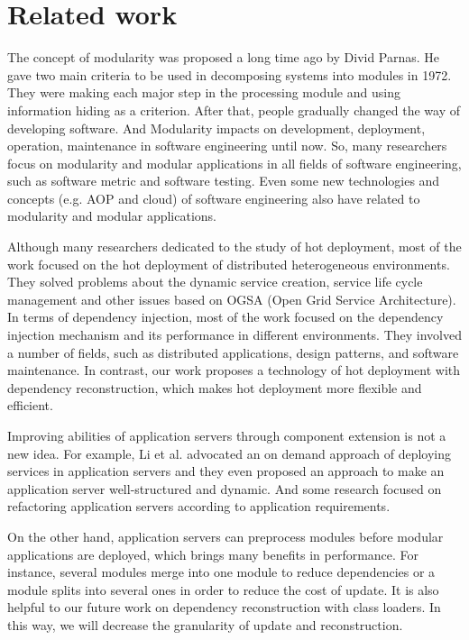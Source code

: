 \documentclass[conference]{IEEEtran}
\begin{document}
\section{Related work\label{sec:relatedwork}}

The concept of modularity was proposed a long time ago by Divid Parnas\cite{Divid_specification}.
He gave two main criteria\cite{Divid_criteria} to be used in decomposing systems into modules in 1972.
They were making each major step in the processing module and using information hiding as a criterion.
After that, people gradually changed the way of developing software.
And Modularity impacts on development, deployment, operation, maintenance in software engineering until now.
So, many researchers focus on modularity and modular applications in all fields of software engineering, such as software metric\cite{module_metric} and software testing\cite{module_test}.
Even some new technologies and concepts (e.g. AOP\cite{module_aop} and cloud\cite{module_cloud}) of software engineering also have related to modularity and modular applications.

Although many researchers dedicated to the study of hot deployment, most of the work focused on the hot deployment of distributed heterogeneous environments\cite{related_hot_1, related_hot_2, related_hot_3, related_hot_4}.
They solved problems about the dynamic service creation, service life cycle management and other issues based on OGSA (Open Grid Service Architecture).
In terms of dependency injection, most of the work focused on the dependency injection mechanism and its performance in different environments\cite{related_DI_1, related_DI_2, related_DI_3}.
They involved a number of fields, such as distributed applications, design patterns, and software maintenance.
In contrast, our work proposes a technology of hot deployment with dependency reconstruction, which makes hot deployment more flexible and efficient.

Improving abilities of application servers through component extension is not a new idea.
For example, Li et al. advocated an on demand approach of deploying services in application servers\cite{related_AS_1} and they even proposed an approach to make an application server well-structured and dynamic\cite{related_AS_2}.
And some research focused on refactoring application servers according to application requirements\cite{related_AS_3}.
	
On the other hand, application servers can preprocess modules before modular applications are deployed, which brings many benefits in performance. 
For instance, several modules merge into one module to reduce dependencies\cite{related_merge} or a module splits into several ones in order to reduce the cost of update\cite{related_split}.
It is also helpful to our future work on dependency reconstruction with class loaders.
In this way, we will decrease the granularity of update and reconstruction.
\end{document}
